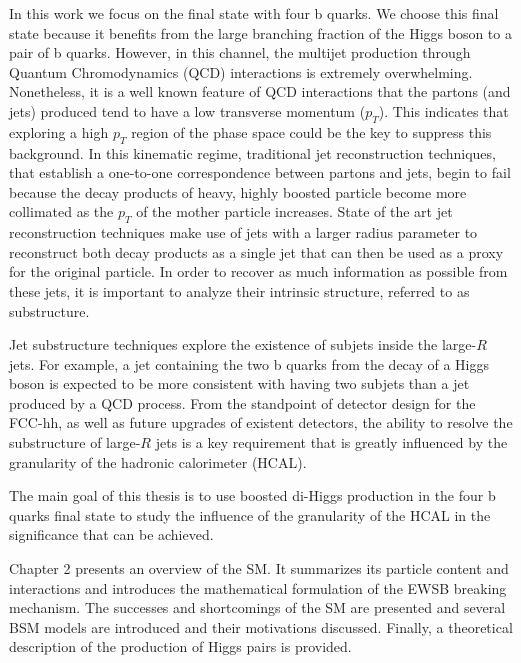 In this work we focus on the final state with four b quarks. We choose this final state because it benefits from the large branching fraction of the Higgs boson to a pair of b quarks. However, in this channel, the multijet production through Quantum Chromodynamics (QCD) interactions is extremely overwhelming. Nonetheless, it is a well known feature of QCD interactions that the partons (and jets) produced tend to have a low transverse momentum ($p_T$). This indicates that exploring a high $p_T$ region of the phase space could be the key to suppress this background. In this kinematic regime, traditional jet reconstruction techniques, that establish a one-to-one correspondence between partons and jets, begin to fail because the decay products of heavy, highly boosted particle become more collimated as the $p_T$ of the mother particle increases. State of the art jet reconstruction techniques make use of jets with a larger radius parameter to reconstruct both decay products as a single jet that can then be used as a proxy for the original particle. In order to recover as much information as possible from these jets, it is important to analyze their intrinsic structure, referred to as substructure. 

Jet substructure techniques explore the existence of subjets inside the large-$R$ jets. For example, a jet containing the two b quarks from the decay of a Higgs boson is expected to be more consistent with having two subjets than a jet produced by a QCD process. From the standpoint of detector design for the FCC-hh, as well as future upgrades of existent detectors, the ability to resolve the substructure of large-$R$ jets is a key requirement that is greatly influenced by the granularity of the hadronic calorimeter (HCAL).

The main goal of this thesis is to use boosted di-Higgs production in the four b quarks final state to study the influence of the granularity of the HCAL in the significance that can be achieved.


Chapter 2 presents an overview of the SM. It summarizes its particle content and interactions and introduces the mathematical formulation of the EWSB breaking mechanism. The successes and shortcomings of the SM are presented and several BSM models are introduced and their motivations discussed. Finally, a theoretical description of the production of Higgs pairs is provided.

